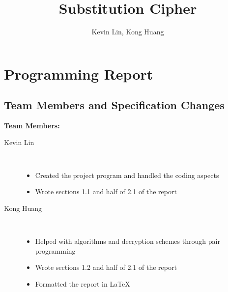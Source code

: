 \documentclass[a4paper,twoside,10pt]{report}
\begin{document}
\pagestyle{empty} %



\title{Substitution Cipher}
\author{Kevin Lin, Kong Huang}
\maketitle



\tableofcontents %
\cleardoublepage %

\pagestyle{plain} %


\chapter{Programming Report}\label{report}

\section{Team Members and Specification Changes}\label{members}
\noindent
\textbf{Team Members:}
\begin{description}
	\item[Kevin Lin] \hfill \\
	\vspace{-5mm}
	\begin{itemize}
		\item Created the project program and handled the coding aspects
		\item Wrote sections 1.1 and half of 2.1 of the report
	\end{itemize}
	\item[Kong Huang] \hfill \\
	\vspace{-5mm}
	\begin{itemize}
		\item Helped with algorithms and decryption schemes through pair programming
		\item Wrote sections 1.2 and half of 2.1 of the report
		\item Formatted the report in LaTeX
	\end{itemize}
\end{description}
\end{document}
